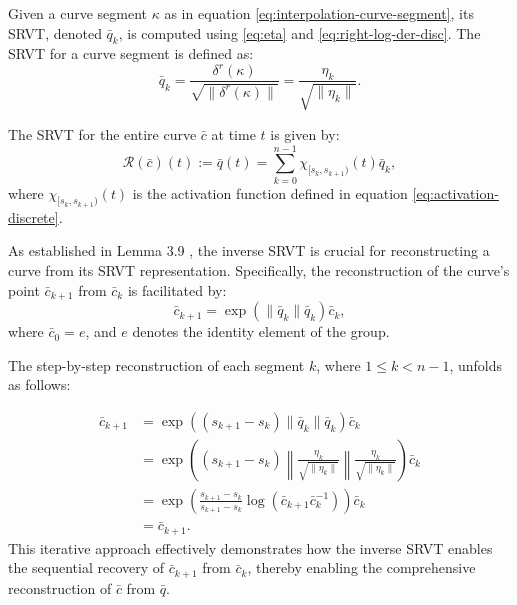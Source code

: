 Given a curve segment \( \kappa \) as in equation \eqref{eq:interpolation-curve-segment}, its SRVT, denoted \( \bar{q}_k \), is computed using \eqref{eq:eta} and \eqref{eq:right-log-der-disc}. The SRVT for a curve segment is defined as:
\begin{equation}
    \bar{q}_k = \frac{\delta^r(\kappa)}{\sqrt{\|\delta^r(\kappa)\|}} = \frac{\eta_k}{\sqrt{\|\eta_k\|}}.
    \label{eq:srvt-discrete}
\end{equation}

The SRVT for the entire curve \( \bar{c} \) at time \( t \) is given by:
\begin{equation}
    \mathcal{R}(\bar{c})(t) := \bar{q}(t) = \sum_{k=0}^{n-1} \chi_{[s_k, s_{k+1})}(t) \bar{q}_k,
\end{equation}
where \( \chi_{[s_k, s_{k+1})}(t) \) is the activation function defined in equation \eqref{eq:activation-discrete}.

As established in Lemma 3.9 \cite{celledoniShapeAnalysisLie2016}, the inverse SRVT is crucial for reconstructing a curve from its SRVT representation. Specifically, the reconstruction of the curve's point \( \bar{c}_{k+1} \) from \( \bar{c}_k \) is facilitated by:
\begin{equation}
    \bar{c}_{k+1} = \exp\left(\|\bar{q}_k\| \bar{q}_k\right) \bar{c}_k,
    \label{eq:srvt-inverse}
\end{equation}
where \( \bar{c}_0 = e \), and \( e \) denotes the identity element of the group.

The step-by-step reconstruction of each segment \( k \), where \( 1 \leq k < n-1 \), unfolds as follows:

\begin{align}
    \bar c_{k+1} &= \exp\left((s_{k+1} - s_k) \| \bar{q}_k \| \bar{q}_k \right) \bar c_k \\
    &= \exp\left( (s_{k+1} - s_k) \left\| \frac{\eta_k}{\sqrt{\| \eta_k \|}} \right\| \frac{\eta_k}{\sqrt{\| \eta_k \|}} \right) \bar c_k \\
    &= \exp\left( \frac{s_{k+1} - s_k}{s_{k+1} - s_k} \log(\bar c_{k+1} \bar c_k^{-1}) \right) \bar c_k \\
    &= \bar c_{k+1}.
\end{align}
This iterative approach effectively demonstrates how the inverse SRVT enables the sequential recovery of \( \bar{c}_{k+1} \) from \( \bar{c}_k \), thereby enabling the comprehensive reconstruction of \( \bar{c} \) from \( \bar{q} \).



